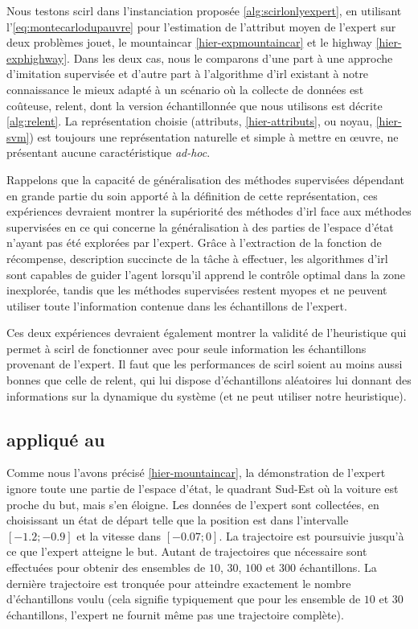 \documentclass[frenchb,a4paper,justified,notoc]{tufte-book}
\begin{document}
   Nous testons \gls{scirl} dans l'instanciation proposée \autoref{alg:scirlonlyexpert}, en utilisant l'\autoref{eq:montecarlodupauvre} pour l'estimation de l'attribut moyen de l'expert sur deux problèmes jouet, le \gls{mountaincar} \autoref{hier-expmountaincar} et le \gls{highway} \autoref{hier-exphighway}. Dans les deux cas, nous le comparons d'une part à une approche d'imitation supervisée et d'autre part à l'algorithme d'\gls{irl} existant à notre connaissance le mieux adapté à un scénario où la collecte de données est coûteuse, \gls{relent}, dont la version échantillonnée que nous utilisons est décrite \autoref{alg:relent}. La représentation choisie (attributs, \autoref{hier-attributs}, ou noyau, \autoref{hier-svm}) est toujours une représentation naturelle et simple à mettre en œuvre, ne présentant aucune caractéristique \emph{ad-hoc}. 
   
   Rappelons que la capacité de généralisation des méthodes supervisées dépendant en grande partie du soin apporté à la définition de cette représentation, ces expériences devraient montrer la supériorité des méthodes d'\gls{irl} face aux méthodes supervisées en ce qui concerne la généralisation à des parties de l'espace d'état n'ayant pas été explorées par l'expert. Grâce à l'extraction de la fonction de récompense, description succincte de la tâche à effectuer, les algorithmes d'\gls{irl} sont capables de guider l'agent lorsqu'il apprend le contrôle optimal dans la zone inexplorée, tandis que les méthodes supervisées restent myopes et ne peuvent utiliser toute l'information contenue dans les échantillons de l'expert.
   
   Ces deux expériences devraient également montrer la validité de l'heuristique qui permet à \gls{scirl} de fonctionner avec pour seule information les échantillons provenant de l'expert. Il faut que les performances de \gls{scirl} soient au moins aussi bonnes que celle de \gls{relent}, qui lui dispose d'échantillons aléatoires lui donnant des informations sur la dynamique du système (et ne peut utiliser notre heuristique). 
\subsection{ appliqué au }
\label{sec-5-4-2}
\label{hier-expmountaincar}

    Comme nous l'avons précisé \autoref{hier-mountaincar}, la démonstration de l'expert ignore toute une partie de l'espace d'état, le quadrant Sud-Est où la voiture est proche du but, mais s'en éloigne. Les données de l'expert sont collectées, en choisissant un état de départ telle que la position est dans l'intervalle $[-1.2;-0.9]$ et la vitesse dans $[-0.07;0]$. La trajectoire est poursuivie jusqu'à ce que l'expert atteigne le but. Autant de trajectoires que nécessaire sont effectuées pour obtenir des ensembles de $10$, $30$, $100$ et $300$ échantillons. La dernière trajectoire est tronquée pour atteindre exactement le nombre d'échantillons voulu (cela signifie typiquement que pour les ensemble de $10$ et $30$ échantillons, l'expert ne fournit même pas une trajectoire complète).
\end{document}
